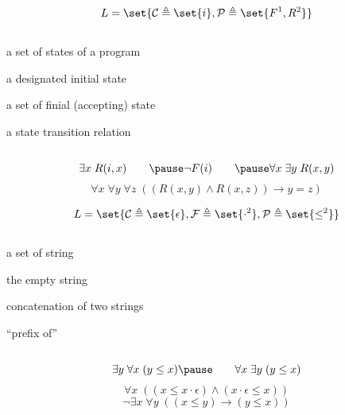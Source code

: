 \begin{frame}{}
  \[
    L = \set{\mathcal{C} \triangleq \set{i},
      \mathcal{P} \triangleq \set{F^{1}, R^{2}}}
  \]

  \pause
  \begin{columns}
      \begin{description}[$R^{\U}$:]
        \item[$|\U|$:] a set of states of a program
        \item[$i^{\U}$:] a designated initial state
        \item[$F^{\U}$:] a set of finial (accepting) state
        \item[$R^{\U}$:] a state transition relation
      \end{description}
  \end{columns}

  \pause
  \vspace{0.80cm}
  \[
    \exists x\; R(i, x) \qquad\pause
    \lnot F(i) \qquad\pause
    \forall x\; \exists y\; R(x, y)
  \]
  \pause
  \[
    \forall x\; \forall y\; \forall z\;
      ((R(x, y) \land R(x, z)) \to y = z)
  \]
\end{frame}

\begin{frame}{}
  \[
    L = \set{\mathcal{C} \triangleq \set{\epsilon},
      \mathcal{F} \triangleq \set{\cdot^{2}},
      \mathcal{P} \triangleq \set{\le^{2}}}
  \]

  \pause
  \begin{columns}
      \begin{description}[$R^{\U}$:]
        \item[$|\U|$:] a set of string
        \item[$\epsilon^{\U}$:] the empty string
        \item[$\cdot^{\U}$:] concatenation of two strings
        \item[$\le^{\U}$:] ``prefix of''
      \end{description}
  \end{columns}

  \pause
  \vspace{0.80cm}
  \[
    \exists y\; \forall x\; (y \le x) \pause\qquad
    \forall x\; \exists y\; (y \le x)
  \]
  \pause
  \[
    \forall x\; ((x \le x \cdot \epsilon) \land (x \cdot \epsilon \le x))
  \]
  \pause
  \[
    \lnot\exists x\;\forall y\; ((x \le y) \to (y \le x))
  \]
\end{frame}

